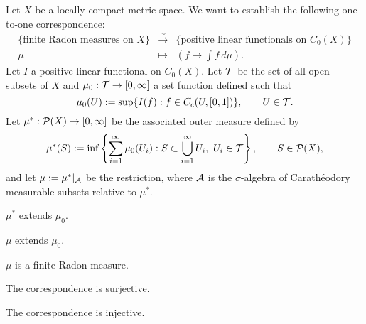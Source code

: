 \documentclass{../../large}
\begin{document}
\begin{prb}
Let $X$ be a locally compact metric space.
We want to establish the following one-to-one correspondence:
\[\begin{array}{ccc}
\{\text{finite Radon measures on $X$}\} & \xrightarrow{\sim} & \{\text{positive linear functionals on $C_0(X)$}\}\\
\mu & \mapsto & (f\mapsto\int f\,d\mu).
\end{array}\]
Let $I$ a positive linear functional on $C_0(X)$.
Let $\mathcal{T}$ be the set of all open subsets of $X$ and $\mu_0:\mathcal{T}\to[0,\infty]$ a set function defined such that
\[\mu_0(U):=\sup\{I(f):f\in C_c(U,[0,1])\},\qquad U\in\mathcal{T}.\]
Let $\mu^*:\mathcal{P}(X)\to[0,\infty]$ be the associated outer measure defined by
\[\mu^*(S):=\inf\left\{\sum_{i=1}^\infty\mu_0(U_i):S\subset\bigcup_{i=1}^\infty U_i,\ U_i\in\mathcal{T}\right\},\qquad S\in\mathcal{P}(X),\]
and let $\mu:=\mu^*|_{\mathcal{A}}$ be the restriction, where $\mathcal{A}$ is the $\sigma$-algebra of Carath\'eodory measurable subsets relative to $\mu^*$.
\begin{parts}
\item $\mu^*$ extends $\mu_0$.
\item $\mu$ extends $\mu_0$.
\item $\mu$ is a finite Radon measure.
\item The correspondence is surjective.
\item The correspondence is injective.
\end{parts}
\end{prb}
\end{document}
